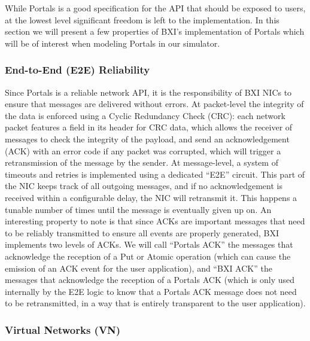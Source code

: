 While Portals is a good specification for the API that should be exposed to
users, at the lowest level significant freedom is left to the implementation. In
this section we will present a few properties of BXI's implementation of Portals
which will be of interest when modeling Portals in our simulator.

\subsubsection{End-to-End (E2E) Reliability}
\label{subsubsec:2_context_hpc:E2E}

Since Portals is a reliable network API, it is the responsibility of BXI NICs to
ensure that messages are delivered without errors. At packet-level the integrity
of the data is enforced using a Cyclic Redundancy Check (CRC): each network
packet features a field in its header for CRC data, which allows the receiver of
messages to check the integrity of the payload, and send an acknowledgement
(ACK) with an error code if any packet was corrupted, which will trigger a
retransmission of the message by the sender. At message-level, a system of
timeouts and retries is implemented using a dedicated ``E2E'' circuit. This part
of the NIC keeps track of all outgoing messages, and if no acknowledgement is
received within a configurable delay, the NIC will retransmit it. This happens a
tunable number of times until the message is eventually given up on. An
interesting property to note is that since ACKs are important messages that need
to be reliably transmitted to ensure all events are properly generated, BXI
implements two levels of ACKs. We will call ``Portals ACK'' the messages that
acknowledge the reception of a Put or Atomic operation (which can cause the
emission of an ACK event for the user application), and ``BXI ACK'' the messages
that acknowledge the reception of a Portals ACK (which is only used internally
by the E2E logic to know that a Portals ACK message does not need to be
retransmitted, in a way that is entirely transparent to the user application).

\subsubsection{Virtual Networks (VN)}
\label{subsubsec:2_context_hpc:VNs}

